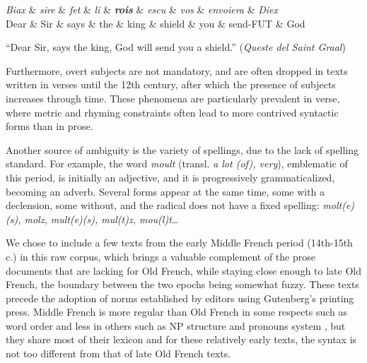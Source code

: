 \begin{center}
    \begin{dependency}[theme=simple]
        \begin{deptext}[row 2/.style={font=\small}]
            \textit{Biax} \& \textit{sire} \& \textit{fet} \& \textit{li} \& \textbf{\textit{rois}} \& \textit{escu} \& \textit{vos} \& \textit{envoiera} \& \textit{Diex} \\
            Dear \& Sir \& says \& the \& king \& shield \& you \& send-FUT \& God \\
        \end{deptext}
    \end{dependency}

    \raggedright
    \enquote{Dear Sir, says the king, God will send you a shield.} (\emph{Queste del Saint Graal})
\end{center}

Furthermore, overt subjects are not mandatory, and are often dropped in texts written in verses until the 12th century, after which the presence of subjects increases through time.
These phenomena are particularly prevalent in verse, where metric and rhyming constraints often lead to more contrived syntactic forms than in prose.

Another source of ambiguity is the variety of spellings, due to the lack of spelling standard. For example, the word \textit{moult} (transl. \textit{a lot (of), very}), emblematic of this period, is initially an adjective, and it is progressively grammaticalized, becoming an adverb. Several forms appear at the same time, some with a declension, some without, and the radical does not have a fixed spelling: \textit{molt(e)(s), molz, mult(e)(s), mul(t)z, mou(l)t}…

We chose to include a few texts from the early Middle French period (14th-15th c.) in this raw corpus, which brings a valuable complement of the prose documents that are lacking for Old French, while staying close enough to late Old French, the boundary between the two epochs being somewhat fuzzy.
These texts precede the adoption of norms established by editors using Gutenberg's printing press. Middle French is more regular than Old French in some respects such as word order \citep{marchello-Nizia-etal-2020-grande} and less in others such as NP structure and pronouns system \citep{marchello-nizia-etal-1979-histoire}, but they share most of their lexicon and for these relatively early texts, the syntax is not too different from that of late Old French texts.

